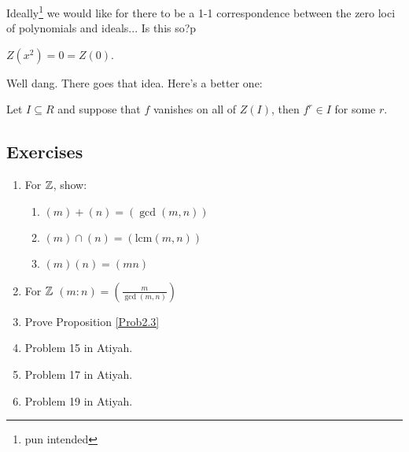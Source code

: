 \documentclass[12pt, twosided]{article}
\begin{document}
  Ideally\footnote{pun intended} we would like for there to be a 1-1 correspondence between the zero loci of polynomials and ideals... Is this so?p

  \begin{exa}
    \(Z(x^2) = 0 = Z(0)\).
  \end{exa}

  Well dang. There goes that idea. Here's a better one:

  \begin{thm}
    Let \(I \subseteq R\) and suppose that \(f\) vanishes on all of \(Z(I)\), then \(f^r \in I\) for some \(r\).
  \end{thm}

  \subsection{Exercises}
  \begin{enumerate}
  \item For \(\mathbb{Z}\), show:
    \begin{enumerate}
    \item \((m) + (n) = (\gcd(m,n))\)
    \item \((m) \cap (n) = (\mathrm{lcm}(m, n))\)
    \item \((m)(n) = (mn)\)
    \end{enumerate}
  \item For \(\mathbb{Z}\) \((m:n) = \left(\frac{m}{\gcd(m,n)}\right)\)
  \item Prove Proposition \ref{Prob2.3}
  \item Problem 15 in Atiyah.
  \item Problem 17 in Atiyah.
  \item Problem 19 in Atiyah.
  \end{enumerate}
\end{document}
